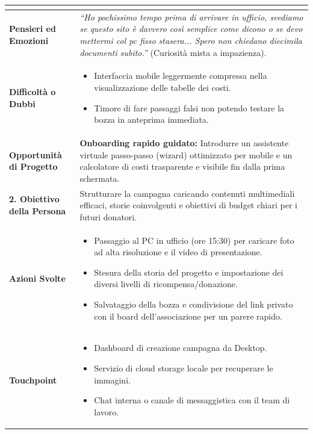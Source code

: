 \documentclass[11pt,a4paper]{article}
\begin{document}
\begin{table}[h!]
\begin{tabular}{|p{3.2cm}|p{11.8cm}|}
\begin{itemize}[leftmargin=*,nosep]
\end{itemize} \\ \hline
\textbf{Pensieri ed Emozioni} &
\textit{``Ho pochissimo tempo prima di arrivare in ufficio, svediamo se questo sito è davvero così semplice come dicono o se devo mettermi col pc fisso stasera... Spero non chiedano diecimila documenti subito.''} (Curiosità mista a impazienza). \\ \hline
\textbf{Difficoltà o Dubbi} &
\begin{itemize}[leftmargin=*,nosep]
    \item Interfaccia mobile leggermente compressa nella visualizzazione delle tabelle dei costi.
    \item Timore di fare passaggi falsi non potendo testare la bozza in anteprima immediata.
\end{itemize} \\ \hline
\textbf{Opportunità di Progetto} &
\textbf{Onboarding rapido guidato:} Introdurre un assistente virtuale passo-passo (wizard) ottimizzato per mobile e un calcolatore di costi trasparente e visibile fin dalla prima schermata. \\ \hline
\hline
\textbf{2. Obiettivo della Persona} & Strutturare la campagna caricando contenuti multimediali efficaci, storie coinvolgenti e obiettivi di budget chiari per i futuri donatori. \\ \hline
\textbf{Azioni Svolte} &
\begin{itemize}[leftmargin=*,nosep]
    \item Passaggio al PC in ufficio (ore 15:30) per caricare foto ad alta risoluzione e il video di presentazione.
    \item Stesura della storia del progetto e impostazione dei diversi livelli di ricompensa/donazione.
    \item Salvataggio della bozza e condivisione del link privato con il board dell'associazione per un parere rapido.
\end{itemize} \\ \hline
\textbf{Touchpoint} &
\begin{itemize}[leftmargin=*,nosep]
    \item Dashboard di creazione campagna da Desktop.
    \item Servizio di cloud storage locale per recuperare le immagini.
    \item Chat interna o canale di messaggistica con il team di lavoro.
\end{itemize} \\ \hline

\end{tabular}
\end{table}
\end{document}
